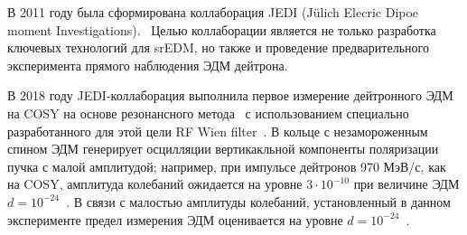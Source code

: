 В 2011 году была сформирована коллаборация JEDI (J\"ulich Elecric Dipoe moment Investigations).~\cite{JEDI:Website} 
Целью коллаборации является не только разработка ключевых технологий для srEDM, но также и проведение предварительного эксперимента прямого наблюдения ЭДМ дейтрона. 

В 2018 году JEDI-коллаборация выполнила первое измерение дейтронного ЭДМ на COSY на основе резонансного метода~\cite{COSY:Partially-Frozen-Spin, COSY:SpinTuneMapping} 
с использованием специально разработанного для этой цели RF Wien filter~\cite{JSlim:RFWF:Design, JSlim:RFWF:Commisioning}. 
В кольце с незамороженным спином 
ЭДМ генерирует осцилляции вертикакльной компоненты поляризации пучка с малой амплитудой; например, 
при импульсе дейтронов 970 МэВ/с, как на COSY, амплитуда колебаний ожидается на уровне 
$3\cdot10^{-10}$ при величине ЭДМ $d = 10^{-24}$~\ecm. В связи с малостью амплитуды колебаний, установленный в данном эксперименте предел измерения ЭДМ оценивается на уровне $d=10^{-24}$~\ecm.